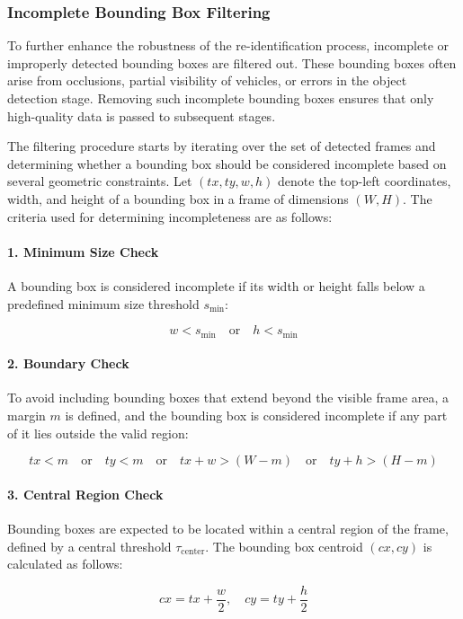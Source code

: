 \subsubsection{Incomplete Bounding Box Filtering}
To further enhance the robustness of the re-identification process, incomplete or improperly detected bounding boxes are filtered out. These bounding boxes often arise from occlusions, partial visibility of vehicles, or errors in the object detection stage. Removing such incomplete bounding boxes ensures that only high-quality data is passed to subsequent stages.

The filtering procedure starts by iterating over the set of detected frames and determining whether a bounding box should be considered incomplete based on several geometric constraints. Let \((tx, ty, w, h)\) denote the top-left coordinates, width, and height of a bounding box in a frame of dimensions \((W, H)\). The criteria used for determining incompleteness are as follows:

\paragraph{1. Minimum Size Check}
A bounding box is considered incomplete if its width or height falls below a predefined minimum size threshold \(s_{\text{min}}\):

\[
w < s_{\text{min}} \quad \text{or} \quad h < s_{\text{min}}
\]

\paragraph{2. Boundary Check}
To avoid including bounding boxes that extend beyond the visible frame area, a margin \(m\) is defined, and the bounding box is considered incomplete if any part of it lies outside the valid region:

\[
tx < m \quad \text{or} \quad ty < m \quad \text{or} \quad tx + w > (W - m) \quad \text{or} \quad ty + h > (H - m)
\]

\paragraph{3. Central Region Check}
Bounding boxes are expected to be located within a central region of the frame, defined by a central threshold \(\tau_{\text{center}}\). The bounding box centroid \((cx, cy)\) is calculated as follows:

\[
cx = tx + \frac{w}{2}, \quad cy = ty + \frac{h}{2}
\]

